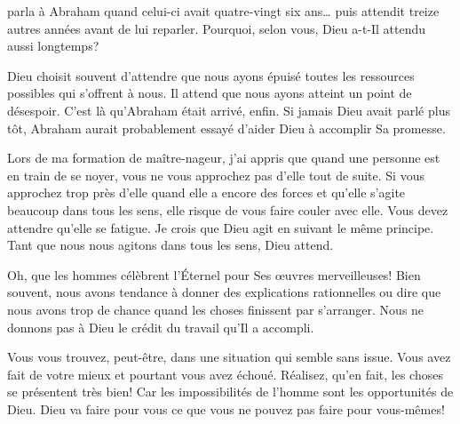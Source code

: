  parla à Abraham quand celui-ci avait quatre-vingt
 six ans\dots{} puis attendit treize autres années avant de lui reparler.
 Pourquoi, selon vous, Dieu a-t-Il attendu aussi longtemps? 

Dieu choisit souvent d'attendre que nous ayons épuisé toutes les ressources
 possibles qui s'offrent à nous.
 Il attend que nous ayons atteint un point de désespoir.
 C'est là qu'Abraham était arrivé, enfin.
 Si jamais Dieu avait parlé plus tôt, Abraham aurait probablement essayé
 d'aider Dieu à accomplir Sa promesse. 

Lors de ma formation de maître-nageur, j'ai appris que quand une personne
 est en train de se noyer, vous ne vous approchez pas d'elle tout de suite.
 Si vous approchez trop près d'elle quand elle a encore des forces
 et qu'elle s'agite beaucoup dans tous les sens,
 elle risque de vous faire couler avec elle.
 Vous devez attendre qu'elle se fatigue.
 Je crois que Dieu agit en suivant le même principe.
 Tant que nous nous agitons dans tous les sens, Dieu attend. 


\og Oh, que les hommes célèbrent l'Éternel pour
 Ses œuvres merveilleuses! \fg{}
 Bien souvent, nous avons tendance à donner des explications rationnelles
 ou dire que nous avons trop de chance quand les choses finissent
 par s'arranger.
 Nous ne donnons pas à Dieu le crédit du travail qu'Il a accompli. 

Vous vous trouvez, peut-être, dans une situation qui semble sans issue.
 Vous avez fait de votre mieux et pourtant vous avez échoué.
 Réalisez, qu'en fait, les choses se présentent très bien!
 Car les impossibilités de l'homme sont les opportunités de Dieu.
 Dieu va faire pour vous ce que vous ne pouvez pas faire pour vous-mêmes! 

\dvrule






